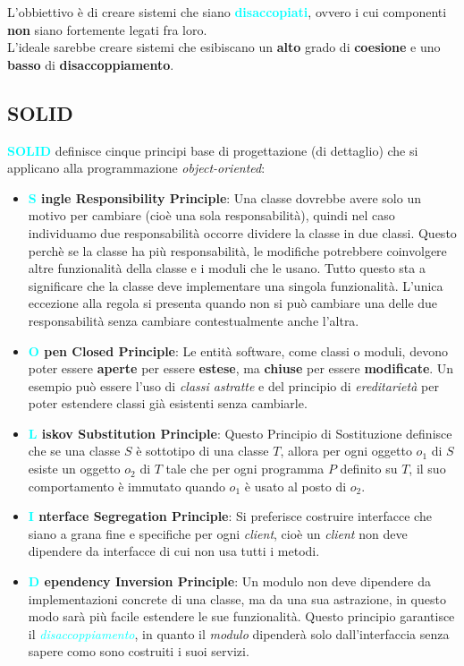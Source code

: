 L'obbiettivo è di creare sistemi che siano \textbf{\textcolor{cyan}{disaccopiati}}, ovvero i cui componenti
\textbf{non} siano fortemente legati fra loro. \\

L'ideale sarebbe creare sistemi che esibiscano un \textbf{alto} grado di \textbf{coesione} e uno \textbf{basso} di
\textbf{disaccoppiamento}.

\subsection{SOLID}

\textbf{\textcolor{cyan}{SOLID}} definisce cinque principi base di progettazione (di dettaglio) che si applicano
alla programmazione \emph{object-oriented}:

\begin{itemize}
    \item \textbf{\textcolor{cyan}{S} ingle Responsibility Principle}: Una classe dovrebbe avere solo un motivo per cambiare (cioè una sola responsabilità), quindi nel caso individuamo due responsabilità
        occorre dividere la classe in due classi. Questo perchè se la classe ha più responsabilità, le modifiche potrebbere
        coinvolgere altre funzionalità della classe e i moduli che le usano. Tutto questo sta a significare che la classe deve implementare una singola funzionalità.
        L'unica eccezione alla regola si presenta quando non si può cambiare una delle due responsabilità senza cambiare contestualmente anche l'altra.
    \item \textbf{\textcolor{cyan}{O} pen Closed Principle}: Le entità software, come classi o moduli, devono poter essere \textbf{aperte} per essere \textbf{estese}, ma \textbf{chiuse} per essere \textbf{modificate}.
        Un esempio può essere l'uso di \emph{classi astratte} e del principio di \emph{ereditarietà} per poter estendere classi già esistenti senza cambiarle.
    \item \textbf{\textcolor{cyan}{L} iskov Substitution Principle}: Questo Principio di Sostituzione definisce che se una classe $S$ è sottotipo di una classe $T$, allora per ogni
        oggetto $o_1$ di $S$ esiste un oggetto $o_2$ di $T$ tale che per ogni programma $P$ definito su $T$, il suo comportamento è
        immutato quando $o_1$ è usato al posto di $o_2$.
    \item \textbf{\textcolor{cyan}{I} nterface Segregation Principle}: Si preferisce costruire interfacce che siano a grana fine e specifiche per ogni \emph{client},
        cioè un \emph{client} non deve dipendere da interfacce di cui non usa tutti i metodi.
    \item \textbf{\textcolor{cyan}{D} ependency Inversion Principle}: Un modulo non deve dipendere da implementazioni concrete di una classe, ma da una sua astrazione, in questo modo sarà più facile
        estendere le sue funzionalità. Questo principio garantisce il \emph{\textcolor{cyan}{disaccoppiamento}}, in quanto il \emph{modulo} dipenderà solo dall'interfaccia senza sapere como sono costruiti i suoi servizi.
\end{itemize}

